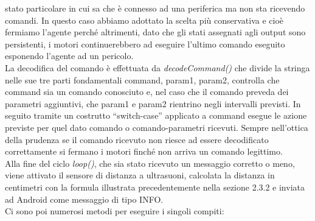 stato particolare in cui sa che è connesso ad una periferica ma non sta ricevendo 
comandi. In questo caso abbiamo adottato la scelta più conservativa e cioè fermiamo 
l'agente perché altrimenti, dato che gli stati assegnati agli output sono persistenti,
i motori continuerebbero ad eseguire l'ultimo comando eseguito esponendo l'agente
ad un pericolo.\\
La decodifica del comando è effettuata da \emph{decodeCommand()} che divide la stringa 
nelle sue tre parti fondamentali command, param1, param2, controlla che command
sia un comando conosciuto e, nel caso che il comando preveda dei parametri aggiuntivi,
che param1 e param2 rientrino negli intervalli previsti. In seguito tramite un costrutto 
``switch-case'' applicato a command esegue le azione previste per quel dato comando o comando-parametri
ricevuti. Sempre nell'ottica della prudenza se il comando ricevuto non riesce ad 
essere decodificato correttamente si fermano i motori finché non arriva un comando 
legittimo.\\
Alla fine del ciclo \emph{loop()}, che sia stato ricevuto un messaggio corretto o meno,
viene attivato il sensore di distanza a ultrasuoni, calcolata la distanza in centimetri
con la formula illustrata precedentemente nella sezione 2.3.2 e inviata ad Android
come messaggio di tipo INFO.\\
Ci sono poi numerosi metodi per eseguire i singoli compiti:
